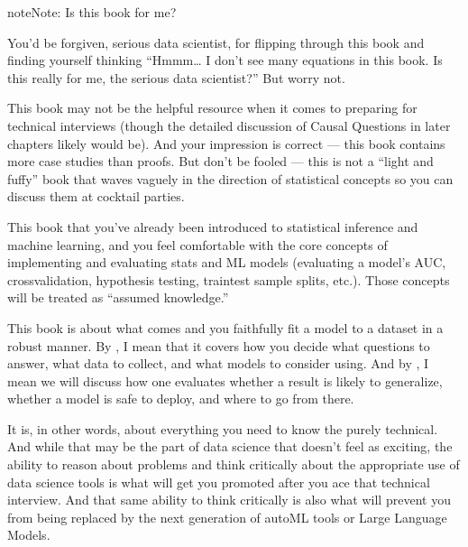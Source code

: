\documentclass[letterpaper,10pt,english]{jupyterBook}
\begin{document}
\begin{sphinxadmonition}{note}{Note:}
\sphinxAtStartPar
Is this book for me?

\sphinxAtStartPar
You’d be forgiven, serious data scientist, for flipping through this book and finding yourself thinking “Hmmm… I don’t see many equations in this book. Is this really for me, the serious data scientist?” But worry not.

\sphinxAtStartPar
This book may not be the  helpful resource when it comes to preparing for technical interviews (though the detailed discussion of Causal Questions in later chapters likely would be). And your impression is correct — this book contains more case studies than proofs. But don’t be fooled — this is not a “light and fuffy” book that waves vaguely in the direction of statistical concepts so you can discuss them at cocktail parties.

\sphinxAtStartPar
This book  that you’ve already been introduced to statistical inference and machine learning, and you feel comfortable with the core concepts of implementing and evaluating stats and ML models (evaluating a model’s AUC, cross\sphinxhyphen{}validation, hypothesis testing, train\sphinxhyphen{}test sample splits, etc.). Those concepts will be treated as “assumed knowledge.”

\sphinxAtStartPar
This book is about what comes  and  you faithfully fit a model to a dataset in a robust manner. By , I mean that it covers how you decide what questions to answer, what data to collect, and what models to consider using. And by , I mean we will discuss how one evaluates whether a result is likely to generalize, whether a model is safe to deploy, and where to go from there.

\sphinxAtStartPar
It is, in other words, about everything you need to know  the purely technical. And while that may be the part of data science that doesn’t feel as exciting, the ability to reason about problems and think critically about the appropriate use of data science tools is what will get you promoted after you ace that technical interview. And that same ability to think critically is also what will prevent you from being replaced by the next generation of auto\sphinxhyphen{}ML tools or Large Language Models.
\end{sphinxadmonition}
\end{document}
